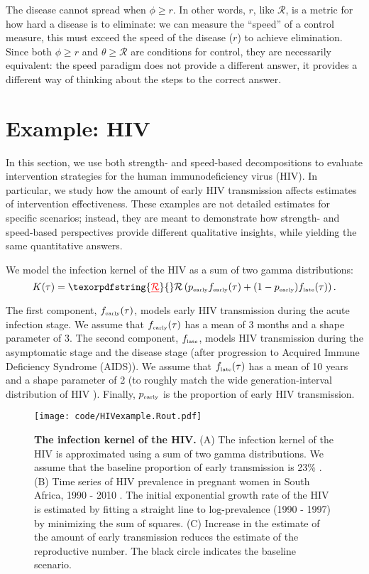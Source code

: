 \documentclass[12pt]{article}
\newcommand{\RR}{\ensuremath{{\mathcal R}}}
\newcommand{\rr}{\ensuremath{{r}}}
\newcommand{\tsub}[2]{#1_{{\textrm{\tiny #2}}}}
\newcommand{\figlab}[1]{\label{fig:#1}}
\providecommand{\DIFdeltex}[1]{{\protect\color{red}\sout{#1}}}                      %
\providecommand{\DIFaddbegin}{} %
\providecommand{\DIFaddend}{} %
\providecommand{\DIFdelbegin}{} %
\providecommand{\DIFdelend}{} %
\providecommand{\DIFdel}[1]{\texorpdfstring{\DIFdeltex{#1}}{}} %
\newcommand{\DIFscaledelfig}{0.5}
\newlength{\DIFdelgraphicswidth} %
\newlength{\DIFdelgraphicsheight} %
\newcommand{\DIFaddincludegraphics}[2][]{{\color{blue}\fbox{\DIFOincludegraphics[#1]{#2}}}} %
\newcommand{\DIFdelincludegraphics}[2][]{%
\sbox{\DIFdelgraphicsbox}{\DIFOincludegraphics[#1]{#2}}%
\settoboxwidth{\DIFdelgraphicswidth}{\DIFdelgraphicsbox} %
\settoboxtotalheight{\DIFdelgraphicsheight}{\DIFdelgraphicsbox} %
\scalebox{\DIFscaledelfig}{%
\parbox[b]{\DIFdelgraphicswidth}{\usebox{\DIFdelgraphicsbox}\\[-\baselineskip] \rule{\DIFdelgraphicswidth}{0em}}\llap{\resizebox{\DIFdelgraphicswidth}{\DIFdelgraphicsheight}{%
\setlength{\unitlength}{\DIFdelgraphicswidth}%
\begin{picture}(1,1)%
\thicklines\linethickness{2pt} %
{\color[rgb]{1,0,0}\put(0,0){\framebox(1,1){}}}%
{\color[rgb]{1,0,0}\put(0,0){\line( 1,1){1}}}%
{\color[rgb]{1,0,0}\put(0,1){\line(1,-1){1}}}%
\end{picture}%
}\hspace*{3pt}}} %
} %
\DeclareRobustCommand{\DIFaddbegin}{\DIFOaddbegin \let\includegraphics\DIFaddincludegraphics} %
\DeclareRobustCommand{\DIFaddend}{\DIFOaddend \let\includegraphics\DIFOincludegraphics} %
\DeclareRobustCommand{\DIFdelbegin}{\DIFOdelbegin \let\includegraphics\DIFdelincludegraphics} %
\DeclareRobustCommand{\DIFdelend}{\DIFOaddend \let\includegraphics\DIFOincludegraphics} %
\begin{document}
The disease cannot spread when $\phi \geq r$. In other words, \rr, like \RR, is a metric for how hard a disease is to eliminate: we can measure the ``speed'' of a control measure, this must exceed the speed of the disease (\rr) to achieve elimination. Since both $\phi \geq r$ and $\theta \geq \RR$ are conditions for control, they are necessarily equivalent: the speed paradigm does not provide a different answer, it provides a different way of thinking about the steps to the correct answer.

\section{Example: HIV}

In this section, we use both strength- and speed-based decompositions to evaluate intervention strategies for the human immunodeficiency virus (HIV). 
In particular, we study how the amount of early HIV transmission affects estimates of intervention effectiveness. 
These examples are not detailed estimates for specific scenarios; 
instead, they are meant to demonstrate how strength- and speed-based perspectives provide different qualitative insights, while yielding the same quantitative answers.

We model the infection kernel of the HIV as a sum of two gamma distributions:
\begin{equation}
K(\tau) = \DIFdelbegin \DIFdel{\mathcal R }\DIFdelend \DIFaddbegin \RR \DIFaddend \left(\tsub{p}{early} \tsub{f}{early}(\tau) + (1-\tsub{p}{early}) \tsub{f}{late}(\tau) \right).
\end{equation}
The first component, $\tsub{f}{early}(\tau)$, models early HIV transmission during the acute infection stage.
We assume that $\tsub{f}{early}(\tau)$ has a mean of 3 months \citep{hollingsworth2008hiv} and a shape parameter of 3.
The second component, $\tsub{f}{late}$, models HIV transmission during the asymptomatic stage and the disease stage (after progression to Acquired Immune Deficiency Syndrome (AIDS)).
We assume that $\tsub{f}{late}(\tau)$ has a mean of 10 years \citep{brookmeyer1989censoring, nishiura2019estimating} and a shape parameter of 2 (to roughly match the wide generation-interval distribution of HIV \citep{fraser2004factors}).
Finally, $\tsub{p}{early}$ is the proportion of early HIV transmission.

\begin{figure}[!th]
\texttt{[image: code/HIVexample.Rout.pdf]}
\caption{
\textbf{The infection kernel of the HIV.}
(A) The infection kernel of the HIV is approximated using a sum of two gamma distributions. We assume that the baseline proportion of early transmission is 23\% \citep{hayes2006amplified}.
(B) Time series of HIV prevalence in pregnant women in South Africa, 1990 - 2010 \citep{barron2013eliminating}. The initial exponential growth rate of the HIV is estimated by fitting a straight line to log-prevalence (1990 - 1997) by minimizing the sum of squares.
(C) Increase in the estimate of the amount of early transmission reduces the estimate of the reproductive number.
The black circle indicates the baseline scenario.
}
\figlab{example}
\end{figure}
\end{document}
